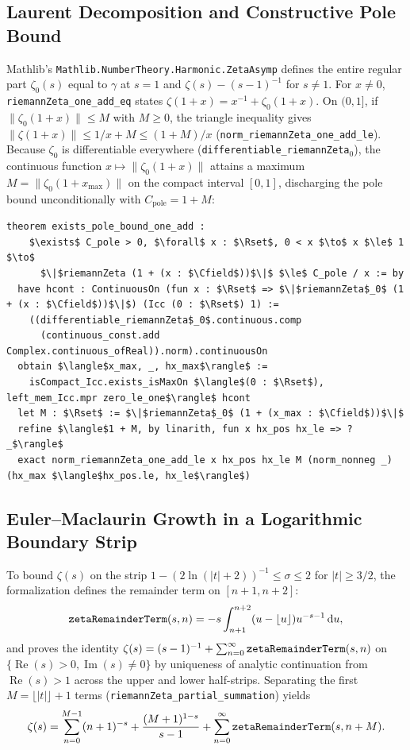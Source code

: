 \documentclass[11pt,a4paper]{article}
\theoremstyle{definition}
\newcommand{\dee}{\mathrm{d}}
\newcommand{\Rset}{\mathbb{R}}
\newcommand{\Cfield}{\mathbb{C}}
\begin{document}
\subsection{Laurent Decomposition and Constructive Pole Bound}

Mathlib's \texttt{Mathlib.NumberTheory.Harmonic.ZetaAsymp} defines the entire regular part $\zeta_0(s)$ equal to $\gamma$ at $s = 1$ and $\zeta(s) - (s-1)^{-1}$ for $s \ne 1$. For $x \ne 0$, \texttt{riemannZeta\_one\_add\_eq} states $\zeta(1+x) = x^{-1} + \zeta_0(1+x)$. On $(0, 1]$, if $\|\zeta_0(1+x)\| \le M$ with $M \ge 0$, the triangle inequality gives $\|\zeta(1+x)\| \le 1/x + M \le (1+M)/x$ (\texttt{norm\_riemannZeta\_one\_add\_le}). Because $\zeta_0$ is differentiable everywhere (\texttt{differentiable\_riemannZeta$_0$}), the continuous function $x \mapsto \|\zeta_0(1+x)\|$ attains a maximum $M = \|\zeta_0(1+x_{\max})\|$ on the compact interval $[0, 1]$, discharging the pole bound unconditionally with $C_{\text{pole}} = 1 + M$:
\begin{lstlisting}
theorem exists_pole_bound_one_add :
    $\exists$ C_pole > 0, $\forall$ x : $\Rset$, 0 < x $\to$ x $\le$ 1 $\to$
      $\|$riemannZeta (1 + (x : $\Cfield$))$\|$ $\le$ C_pole / x := by
  have hcont : ContinuousOn (fun x : $\Rset$ => $\|$riemannZeta$_0$ (1 + (x : $\Cfield$))$\|$) (Icc (0 : $\Rset$) 1) :=
    ((differentiable_riemannZeta$_0$.continuous.comp
      (continuous_const.add Complex.continuous_ofReal)).norm).continuousOn
  obtain $\langle$x_max, _, hx_max$\rangle$ :=
    isCompact_Icc.exists_isMaxOn $\langle$(0 : $\Rset$), left_mem_Icc.mpr zero_le_one$\rangle$ hcont
  let M : $\Rset$ := $\|$riemannZeta$_0$ (1 + (x_max : $\Cfield$))$\|$
  refine $\langle$1 + M, by linarith, fun x hx_pos hx_le => ?_$\rangle$
  exact norm_riemannZeta_one_add_le x hx_pos hx_le M (norm_nonneg _) (hx_max $\langle$hx_pos.le, hx_le$\rangle$)
\end{lstlisting}

\subsection{Euler--Maclaurin Growth in a Logarithmic Boundary Strip}

To bound $\zeta(s)$ on the strip $1 - (2\ln(|t|+2))^{-1} \le \sigma \le 2$ for $|t| \ge 3/2$, the formalization defines the remainder term on $[n+1, n+2]$:
\begin{equation}
\text{\texttt{zetaRemainderTerm}}(s, n) = -s \int_{n+1}^{n+2} (u - \lfloor u \rfloor) u^{-s-1}\,\dee u,
\end{equation}
and proves the identity $\zeta(s) = (s-1)^{-1} + \sum_{n=0}^{\infty} \text{\texttt{zetaRemainderTerm}}(s, n)$ on $\{\operatorname{Re}(s) > 0, \operatorname{Im}(s) \ne 0\}$ by uniqueness of analytic continuation from $\operatorname{Re}(s) > 1$ across the upper and lower half-strips. Separating the first $M = \lfloor |t| \rfloor + 1$ terms (\texttt{riemannZeta\_partial\_summation}) yields
\begin{equation}
\zeta(s) = \sum_{n=0}^{M-1} (n+1)^{-s} + \frac{(M+1)^{1-s}}{s-1} + \sum_{n=0}^{\infty} \text{\texttt{zetaRemainderTerm}}(s, n + M).
\end{equation}
\end{document}
